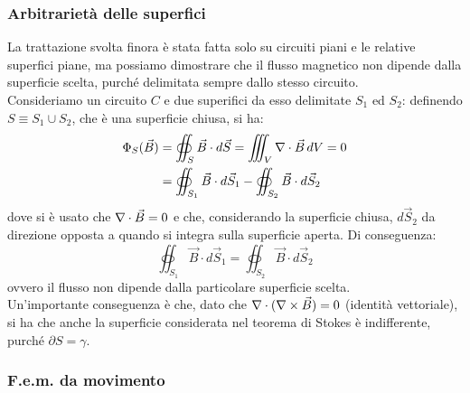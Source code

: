 \documentclass[]{article}
\begin{document}
\subsubsection{Arbitrarietà delle superfici}

La trattazione svolta finora è stata fatta solo su circuiti piani e le relative superfici piane, ma possiamo dimostrare che il flusso magnetico non dipende dalla superficie scelta, purché delimitata sempre dallo stesso circuito. \\ 
%
Consideriamo un circuito $ C $ e due superifici da esso delimitate $ S_1 $ ed $ S_2 $: definendo $ S \equiv S_1 \cup S_2 $, che è una superficie chiusa, si ha:
\begin{equation}
	\begin{split}
		\Phi_S (\vec{B}) &= \oiint_S \vec{B}\cdot d\vec{S} = \iiint_V \nabla\cdot\vec{B} \,dV = 0 \\ 
				 &= \oiint_{S_1} \vec{B}\cdot d\vec{S}_1 - \oiint_{S_2} \vec{B}\cdot d\vec{S}_2
	\end{split}
	\label{eq:6}
\end{equation}
dove si è usato che $ \nabla\cdot\vec{B} = 0 $ e che, considerando la superficie chiusa, $ d\vec{S}_2 $ da direzione opposta a quando si integra sulla superficie aperta. Di conseguenza:
\begin{equation}
	\oiint_{S_1} \vec{B}\cdot d\vec{S}_1 = \oiint_{S_2} \vec{B}\cdot d\vec{S}_2
	\label{eq:7}
\end{equation}
ovvero il flusso non dipende dalla particolare superficie scelta. \\ 
%
Un'importante conseguenza è che, dato che $ \nabla\cdot(\nabla\times\vec{B}) = 0 $ (identità vettoriale), si ha che anche la superficie considerata nel teorema di Stokes è indifferente, purché $ \partial S = \gamma $.

\subsubsection{F.e.m. da movimento}
\end{document}
